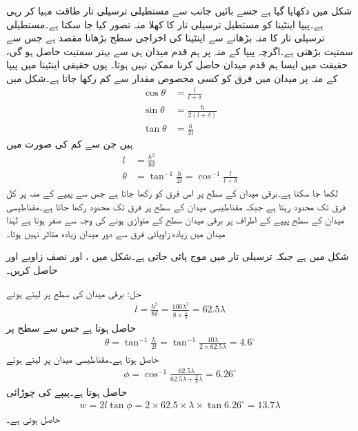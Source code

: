 شکل میں  دکھایا گیا ہے جسے بائیں جانب سے مستطیلی ترسیلی تار طاقت مہیا کر رہی ہے۔پیپا اینٹینا کو مستطیل ترسیلی تار کا کھلا منہ تصور کیا جا سکتا ہے۔مستطیلی ترسیلی تار کا منہ بڑھانے سے اینٹینا کی اخراجی سطح بڑھانا مقصد ہے جس سے سمتیت بڑھتی ہے۔اگرچہ پیپا کے منہ پر ہم قدم میدان ہی سے بہتر سمتیت حاصل ہو گی، حقیقت میں ایسا ہم قدم میدان حاصل کرنا ممکن نہیں ہوتا۔ یوں حقیقی اینٹینا میں پیپا کے منہ پر میدان میں فرق کو کسی مخصوص مقدار  سے کم رکھا جاتا ہے۔شکل میں
  \begin{align*}
\cos \theta&=\frac{l}{l+\delta}\\
\sin \theta&=\frac{h}{2(l+\delta)}\\
\tan \theta&=\frac{h}{2l}
\end{align*}
ہیں جن سے کم  کی صورت میں
\begin{align}
l&=\frac{h^2}{8 \delta}\\
\theta&=\tan^{-1} \frac{h}{2l}=\cos^{-1}\frac{l}{l+\delta}
\end{align}
لکھا جا سکتا ہے۔برقی میدان  کے سطح پر اس فرق کو  رکھا جاتا ہے جس سے پیپے کے منہ پر کل فرق  تک محدود رہتا ہے جبکہ مقناطیسی میدان  کے سطح  پر فرق  تک محدود رکھا جاتا ہے۔مقناطیسی میدان کے سطح پیپے کے اطراف پر برقی میدان سطح کے متوازی ہونے کی وجہ سے صفر ہوتا ہے لہٰذا میدان میں زیادہ زاویائی فرق سے دور میدان زیادہ متاثر نہیں ہوتا۔

شکل میں  ہے جبکہ ترسیلی تار میں  موج پائی جاتی ہے۔شکل میں ،  اور نصف زاویے  اور  حاصل کریں۔

حل:
برقی میدان کی سطح پر  لیتے ہوئے 
\begin{align*}
l=\frac{h^2}{8 \delta}=\frac{100 \lambda^2}{8 \times \frac{\lambda}{5}}=62.5 \lambda
\end{align*}
حاصل ہوتا ہے جس سے  سطح پر 
\begin{align*}
\theta=\tan^{-1}\frac{h}{2l}=\tan^{-1} \frac{10 \lambda}{2\times 62.5 \lambda}=4.6^{\circ}
\end{align*}
حاصل ہوتا ہے۔مقناطیسی میدان پر  لیتے ہوئے 
\begin{align*}
\phi=\cos^{-1} \frac{62.5\lambda}{62.5\lambda+\frac{3}{8}\lambda}=6.26^{\circ}
\end{align*}
حاصل ہوتا ہے۔پیپے کی چوڑائی
\begin{align*}
w=2 l \tan \phi=2 \times 62.5 \times \lambda \times \tan 6.26^{\circ}=13.7 \lambda
\end{align*}
حاصل ہوتی ہے۔

